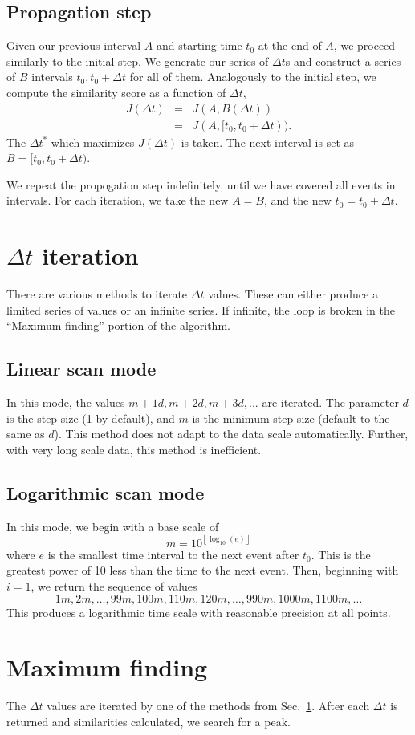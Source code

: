 \documentclass{article}
\begin{document}
\subsection{Propagation step}
\label{sec:meth-propagation}
Given our previous interval $A$ and starting time $t_0$ at the end of
$A$, we proceed similarly to the initial step.  We generate our series
of $\Delta t$s and construct a series of $B$ intervals $t_0,
t_0+\Delta t$ for all of them.  Analogously to the initial step, we
compute the similarity score as a function of $\Delta t$,
\begin{eqnarray}
  J(\Delta t) &=& J(A, B(\Delta t)) \nonumber \\
              &=& J(A,  [t_0, t_0+\Delta t)).
              \label{eq:J-max2}
\end{eqnarray}
The $\Delta t^*$ which maximizes $J(\Delta t)$ is taken.  The next
interval is set as $B = [t_0, t_0+\Delta t)$.

We repeat the propogation step indefinitely, until we have covered all
events in intervals.  For each iteration, we take the new $A = B$, and
the new $t_0 = t_0+\Delta t$.



\section{$\Delta t$ iteration}
\label{sec:meth-dt}
There are various methods to iterate $\Delta t$ values.  These can
either produce a limited series of values or an infinite series.  If
infinite, the loop is broken in the ``Maximum finding'' portion of the
algorithm.

\subsection{Linear scan mode}
In this mode, the values $m+1d, m+2d, m+3d, ...$ are iterated.  The
parameter $d$ is the step size (1 by default), and $m$ is the minimum
step size (default to the same as $d$).  This method does not adapt to
the data scale automatically.  Further, with very long scale data,
this method is inefficient.

\subsection{Logarithmic scan mode}
In this mode, we begin with a base scale of
\begin{equation}
  m = 10^{\left\lfloor \log_10(e)  \right\rfloor}
\end{equation}
where $e$ is the smallest time interval to the next event after $t_0$.
This is the greatest power of 10 less than the time to the next event.
Then, beginning with $i=1$, we return the sequence of values
\begin{equation}
  1m, 2m, \ldots, 99m, 100m, 110m, 120m, \ldots, 990m, 1000m,
  1100m, \ldots
\end{equation}
This produces a logarithmic time scale with reasonable precision at
all points.


\section{Maximum finding}
\label{sec:meth-peak}
The $\Delta t$ values are iterated by one of the methods from
Sec.~\ref{sec:meth-dt}.  After each $\Delta t$ is returned and
similarities calculated, we search for a peak.
\end{document}
